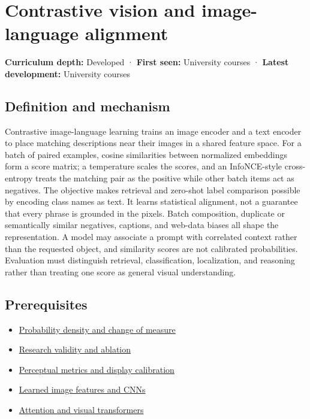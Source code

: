 \hypertarget{appendix-772f1fd96148}{}\label{referencestart:appendix-772f1fd96148}
\section{Contrastive vision and image-language alignment}\label{appendix-772f1fd96148-contrastive-vision-and-image-language-alignment}

\textbf{Curriculum depth:} Developed · \textbf{First seen:} University courses · \textbf{Latest development:} University courses

\subsection{Definition and mechanism}\label{appendix-772f1fd96148-definition-and-mechanism}

Contrastive image-language learning trains an image encoder and a text encoder to place matching descriptions near their images in a shared feature space. For a batch of paired examples, cosine similarities between normalized embeddings form a score matrix; a temperature scales the scores, and an InfoNCE-style cross-entropy treats the matching pair as the positive while other batch items act as negatives. The objective makes retrieval and zero-shot label comparison possible by encoding class names as text. It learns statistical alignment, not a guarantee that every phrase is grounded in the pixels. Batch composition, duplicate or semantically similar negatives, captions, and web-data biases all shape the representation. A model may associate a prompt with correlated context rather than the requested object, and similarity scores are not calibrated probabilities. Evaluation must distinguish retrieval, classification, localization, and reasoning rather than treating one score as general visual understanding.

\subsection{Prerequisites}\label{appendix-772f1fd96148-prerequisites}

\begin{itemize}
\tightlist
\item
  \hyperref[appendix-4815cd87ab8b]{Probability density and change of measure}
\item
  \hyperref[appendix-65788587ef78]{Research validity and ablation}
\item
  \hyperref[appendix-b2c1846508bf]{Perceptual metrics and display calibration}
\item
  \hyperref[appendix-47c51ea026fb]{Learned image features and CNNs}
\item
  \hyperref[appendix-a9d5dfdd164a]{Attention and visual transformers}
\end{itemize}

